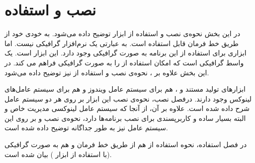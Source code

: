 
\part{نصب و استفاده}

در این بخش نحوه‌ی نصب و استفاده از ابزار  توضیح داده می‌شود.
 به خودی خود از طریق خط فرمان
قابل استفاده است. به عبارتی یک نرم‌افزار گرافیکی نیست. اما ابزاری برای استفاده
از این برنامه به صورت گرافیکی وجود دارد.
این ابزار  است.  یک واسط گرافیکی است که امکان
استفاده از  را به صورت گرافیکی فراهم می کند. در این بخش علاوه بر
، نحوه‌ی نصب و استفاده از  نیز توضیح داده می‌شود.
  
ابزارهای تولید مستند  و ، هم برای سیستم عامل ویندوز
و هم برای سیستم عامل‌های لینوکس وجود دارند.
درفصل نصب، نحوه‌ی نصب این ابزار بر روی هر دو سیستم عامل شرح داده شده است.
علاوه بر آن، از آنجا که سیستم عامل لینوکسی  مدیریت خاص و البته
بسیار ساده و کاربرپسندی برای نصب برنامه‌ها دارد، نحوه‌ی نصب  و
 بر روی این سیستم عامل نیز به طور جداگانه توضیح داده شده است.

در فصل استفاده، نحوه استفاده از  هم از طریق خط فرمان و هم به صورت
گرافیکی (با استفاده از ابزار ) بیان شده است.



